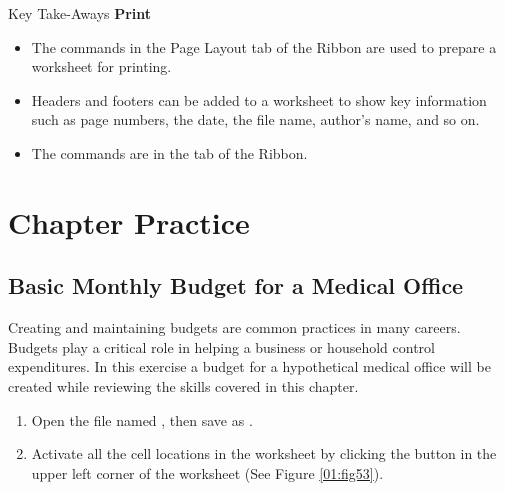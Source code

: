 \begin{center}
	\begin{tkwbox}{Key Take-Aways}
		\textbf{Print}
		\\
		\begin{itemize}
			\setlength{\itemsep}{0pt}
			\setlength{\parskip}{0pt}
			\setlength{\parsep}{0pt}

			\item The commands in the Page Layout tab of the Ribbon are used to prepare a worksheet for printing.
			\item Headers and footers can be added to a worksheet to show key information such as page numbers, the date, the file name, author's name, and so on.
			\item The  commands are in the  tab of the Ribbon.
			
		\end{itemize}
	\end{tkwbox}
\end{center}

\section{Chapter Practice}

\subsection{Basic Monthly Budget for a Medical Office}

Creating and maintaining budgets are common practices in many careers. Budgets play a critical role in helping a business or household control expenditures. In this exercise a budget for a hypothetical medical office will be created while reviewing the skills covered in this chapter.

\begin{enumerate}
	\item Open the file named , then save as .
	\item Activate all the cell locations in the  worksheet by clicking the  button in the upper left corner of the worksheet (See Figure \ref{01:fig53}).
\end{enumerate}

